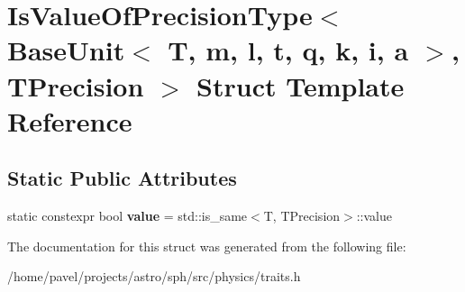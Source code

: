 \hypertarget{structIsValueOfPrecisionType_3_01BaseUnit_3_01T_00_01m_00_01l_00_01t_00_01q_00_01k_00_01i_00_01a_01_4_00_01TPrecision_01_4}{}\section{Is\+Value\+Of\+Precision\+Type$<$ Base\+Unit$<$ T, m, l, t, q, k, i, a $>$, T\+Precision $>$ Struct Template Reference}
\label{structIsValueOfPrecisionType_3_01BaseUnit_3_01T_00_01m_00_01l_00_01t_00_01q_00_01k_00_01i_00_01a_01_4_00_01TPrecision_01_4}
\subsection*{Static Public Attributes}
\begin{DoxyCompactItemize}
\item 
\hypertarget{structIsValueOfPrecisionType_3_01BaseUnit_3_01T_00_01m_00_01l_00_01t_00_01q_00_01k_00_01i_00_01a_01_4_00_01TPrecision_01_4_a1cab4b0253b4fc4a856508e73ae242c8}{}\label{structIsValueOfPrecisionType_3_01BaseUnit_3_01T_00_01m_00_01l_00_01t_00_01q_00_01k_00_01i_00_01a_01_4_00_01TPrecision_01_4_a1cab4b0253b4fc4a856508e73ae242c8} 
static constexpr bool {\bfseries value} = std\+::is\+\_\+same$<$T, T\+Precision$>$\+::value
\end{DoxyCompactItemize}


The documentation for this struct was generated from the following file\+:\begin{DoxyCompactItemize}
\item 
/home/pavel/projects/astro/sph/src/physics/traits.\+h\end{DoxyCompactItemize}
